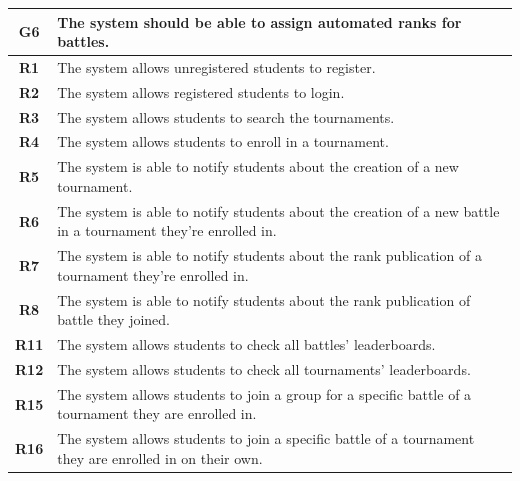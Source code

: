 \documentclass[12pt, a4paper]{report}
\begin{document}
    \begin{table}[H]
        \begin{tabularx}{\textwidth}{cX}
        \textbf{G6}  & The system should be able to assign automated ranks for battles.                                                                 \\ \hline
        \textbf{R1}  & The system allows unregistered students to register.                                                                             \\
        \textbf{R2}  & The system allows registered students to login.                                                                                  \\
        \textbf{R3}  & The system allows students to search the tournaments.                                                                            \\
        \textbf{R4}  & The system allows students to enroll in a tournament.                                                                            \\
        \textbf{R5}  & The system is able to notify students about the creation of a new tournament.                                                    \\
        \textbf{R6}  & The system is able to notify students about the creation of a new battle in a tournament they're enrolled in.                    \\
        \textbf{R7}  & The system is able to notify students about the rank publication of a tournament they're enrolled in.                           \\
        \textbf{R8}  & The system is able to notify students about the rank publication of battle they joined.                                         \\
        \textbf{R11} & The system allows students to check all battles' leaderboards.                                                                   \\
        \textbf{R12} & The system allows students to check all tournaments' leaderboards.                                                               \\
        \textbf{R15} & The system allows students to join a group for a specific battle of a tournament they are enrolled in.                           \\
        \textbf{R16} & The system allows students to join a specific battle of a tournament they are enrolled in on their own.                          \\

\end{tabularx}
\end{table}
\end{document}
